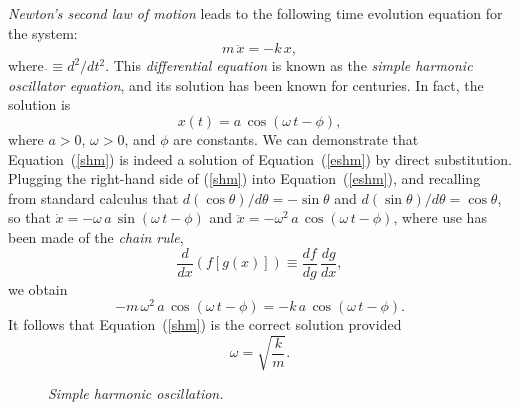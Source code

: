 {\em Newton's second law of motion}\/ leads to the following time evolution equation for the system:
\begin{equation}
m\,\ddot{x} = - k\,x,\label{eshm}
\end{equation}
where $\ddot{}  \equiv d^2/dt^2$. 
This {\em differential equation}\/ is known as the {\em simple harmonic oscillator equation}, and its solution has been known
for centuries. In fact, the solution is
\begin{equation}
x(t) = a\,\cos(\omega\,t-\phi),\label{shm}
\end{equation}
where $a>0$, $\omega>0$, and $\phi$ are constants. We can demonstrate that Equation~(\ref{shm}) is indeed a
solution of Equation~(\ref{eshm}) by direct substitution. Plugging the right-hand side of (\ref{shm}) into 
Equation~(\ref{eshm}), and recalling from standard calculus that $d(\cos\theta)/d\theta = -\sin\theta$ and
$d (\sin\theta)/d\theta = \cos\theta$, so that $\dot{x} = -\omega\,a\,\sin(\omega\,t-\phi)$ and $\ddot{x} = -\omega^2\,a\,\cos(\omega\,t-\phi)$, where use has been made of
the {\em chain rule}, 
\begin{equation}
\frac{d}{dx}\left(f\left[g(x)\right]\right)\equiv \frac{df}{dg}\,\frac{dg}{dx},
\end{equation}
we obtain
\begin{equation}
-m\,\omega^2\,a\,\cos(\omega\,t-\phi) =- k\,a\,\cos(\omega\,t-\phi).
\end{equation}
It follows that Equation~(\ref{shm}) is the correct solution provided
\begin{equation}\label{eomega}
\omega = \sqrt{\frac{k}{m}}.
\end{equation}

\begin{figure}
\epsfysize=3in
\centerline{}
\caption{\em Simple harmonic oscillation.}\label{f2.2}  
\end{figure}

